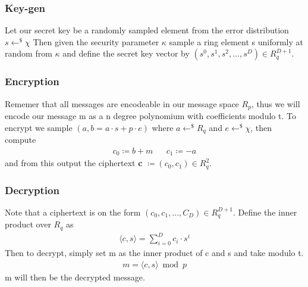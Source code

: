 \documentclass[../main.tex]{subfiles}
\begin{document}
\subsubsection{Key-gen}
Let our secret key be a randomly sampled element from the error distribution $s \leftarrow^\$ \chi$
Then given the security parameter $\kappa$ sample a ring element s uniformly at random from $\kappa$ and define the
secret key vector by $(s^0, s^1, s^2, \dots, s^D) \in R_q^{D+1}$.

\subsubsection{Encryption}
Rememer that all messages are encodeable in our message space $R_p$, thus we will encode our message m as a n degree
polynomium with coefficients modulo t.
To encrypt we sample $(a, b = a \cdot s + p \cdot e)$ where $a \leftarrow^\$ R_q$ and $e \leftarrow^\$ \chi$,
then compute
\begin{align*}
    c_0 \coloneqq b + m &  & c_1 \coloneqq -a
\end{align*}
and from this output the ciphertext \textbf{c} $\coloneqq (c_0, c_1) \in R_q^2$.

\subsubsection{Decryption}
Note that a ciphertext is on the form $(c_0, c_1, \dots , C_{D}) \in R_q^{D+1}$.
Define the inner product over $R_q$ as
\begin{align*}
    \langle c, s \rangle = \sum_{i=0}^{D} c_i \cdot s^i
\end{align*}
Then to decrypt, simply set m as the inner product of c and s and take modulo t.
\begin{align*}
    m = \langle c, s \rangle \bmod p
\end{align*}
m will then be the decrypted message.
\end{document}
